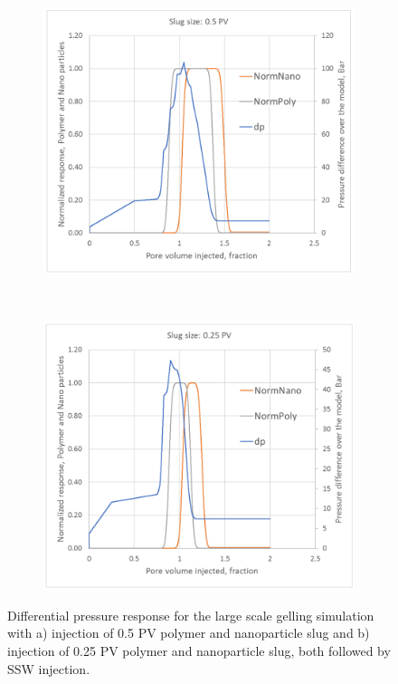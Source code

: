 \begin{figure}[h] %
    \begin{subfigure}{.8\textwidth}
    \centering
    \includegraphics[width=\textwidth]{img/cht/pDiff1.png}
    \caption{}
    \label{cht:pDiff1}
    \end{subfigure}
    \\
    \begin{subfigure}{.8\textwidth}
    \centering
    \includegraphics[width=\textwidth]{img/cht/pDiff2.png}
    \caption{}
    \label{cht:pDiff2}
    \end{subfigure}
    
    \caption{Differential pressure response for the large scale gelling simulation with a) injection of 0.5 PV polymer and nanoparticle slug and b) injection of 0.25 PV polymer and nanoparticle slug, both followed by SSW injection. }
    \label{cht:pDiff}
\end{figure}